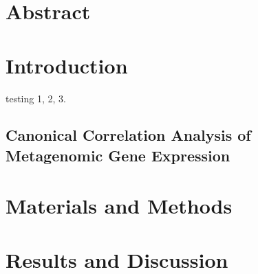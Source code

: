 
\section{Abstract}

\section{Introduction}
testing 1, 2, 3.

\subsection{Canonical Correlation Analysis of Metagenomic Gene Expression}



\section{Materials and Methods}

\section{Results and Discussion}

